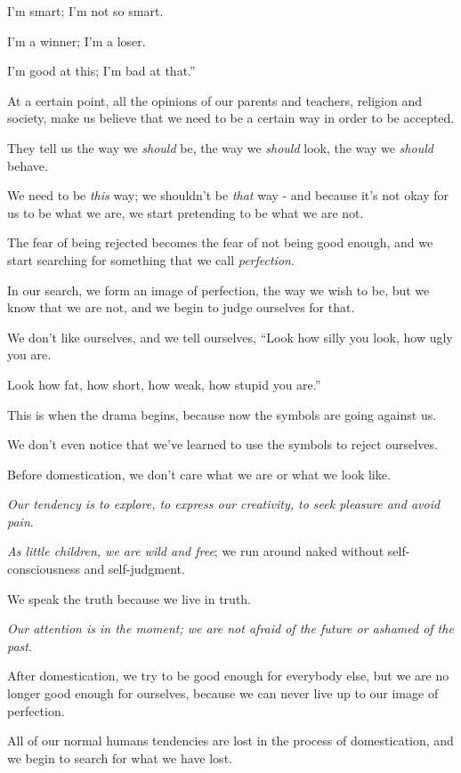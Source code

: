 \documentclass{article}
\numberwithin{equation}{section}
\begin{document}
I'm smart; I'm not so smart.

I'm a winner; I'm a loser.

I'm good at this; I'm bad at that.''

%
At a certain point, all the opinions of our parents and teachers, religion and society, make us believe that we need to be a certain way in order to be accepted.

They tell us the way we \textit{should} be, the way we \textit{should} look, the way we \textit{should} behave.

We need to be \textit{this} way; we shouldn't be \textit{that} way - and because it's not okay for us to be what we are, we start pretending to be what we are not.

The fear of being rejected becomes the fear of not being good enough, and we start searching for something that we call \textit{perfection}.

In our search, we form an image of perfection, the way we wish to be, but we know that we are not, and we begin to judge ourselves for that.

We don't like ourselves, and we tell ourselves, ``Look how silly you look, how ugly you are.

Look how fat, how short, how weak, how stupid you are.''

This is when the drama begins, because now the symbols are going against us.

We don't even notice that we've learned to use the symbols to reject ourselves.

%
Before domestication, we don't care what we are or what we look like.

\textit{Our tendency is to explore, to express our creativity, to seek pleasure and avoid pain}.

\textit{As little children, we are wild and free}; we run around naked without self-consciousness and self-judgment.

We speak the truth because we live in truth.

\textit{Our attention is in the moment; we are not afraid of the future or ashamed of the past}.

After domestication, we try to be good enough for everybody else, but we are no longer good enough for ourselves, because we can never live up to our image of perfection.

%
All of our normal humans tendencies are lost in the process of domestication, and we begin to search for what we have lost.
\end{document}
